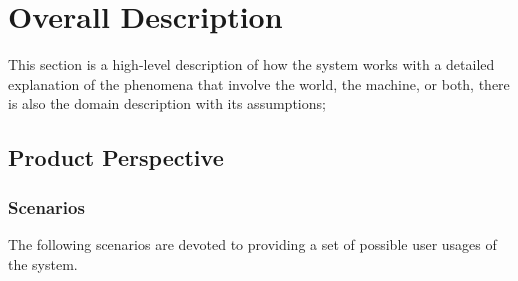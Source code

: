 \chapter{Overall Description}
This section is a high-level description of how the system works with a detailed explanation of the phenomena that involve the world, the machine, or
both, there is also the domain description with its assumptions;

\section{Product Perspective}
\subsection{Scenarios}
The following scenarios are devoted to providing a set of possible user usages of the system.
